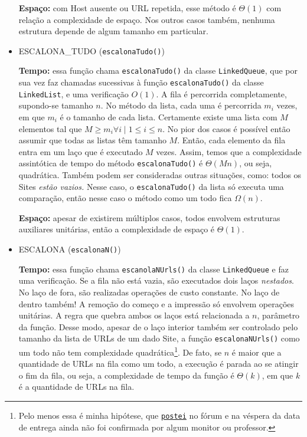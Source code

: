 \documentclass{article}
\def\code#1{\texttt{#1}}
\begin{document}
\begin{itemize}
        \textbf{Espaço:} com Host ausente ou URL repetida, esse método é \( \Theta(1) \) com relação a complexidade de espaço. Nos outros casos também, nenhuma estrutura depende de algum tamanho em particular.

    \item ESCALONA\_TUDO (\code{escalonaTudo()})

        \textbf{Tempo:} essa função chama \code{escalonaTudo()} da classe \code{LinkedQueue}, que por sua vez faz chamadas sucessivas à função \code{escalonaTudo()} da classe \code{LinkedList}, e uma verificação \( O(1) \). A fila é percorrida completamente, supondo-se tamanho \( n \). No método da lista, cada uma é percorrida \( m_i \) vezes, em que \( m_i \) é o tamanho de cada lista. Certamente existe uma lista com \( M \) elementos tal que \( M \geq m_i \forall i \mid 1 \leq i \leq n \). No pior dos casos é possível então assumir que todas as listas têm tamanho \( M \). Então, cada elemento da fila entra em um laço que é executado \( M \) vezes. Assim, temos que a complexidade assintótica de tempo do método \code{escalonaTudo()} é \( \Theta(Mn) \), ou seja, quadrática. Também podem ser consideradas outras situações, como: todos os Sites \textit{estão vazios.} Nesse caso, o \code{escalonaTudo()} da lista só executa uma comparação, então nesse caso o método como um todo fica \( \Omega(n) \).

        \textbf{Espaço:} apesar de existirem múltiplos casos, todos envolvem estruturas auxiliares unitárias, então a complexidade de espaço é \( \Theta(1) \).

    \item ESCALONA (\code{escalonaN()})

        \textbf{Tempo:} essa função chama \code{escanolaNUrls()} da classe \code{LinkedQueue} e faz uma verificação. Se a fila não está vazia, são executados dois laços \textit{nestados}. No laço de fora, são realizadas operações de custo constante. No laço de dentro também! A remoção do começo e a impressão só envolvem operações unitárias. A regra que quebra ambos os laços está relacionada a \( n \), parâmetro da função. Desse modo, apesar de o laço interior também ser controlado pelo tamanho da lista de URLs de um dado Site, a função \code{escalonaNUrls()} como um todo não tem complexidade quadrática\footnote{Pelo menos essa é minha hipótese, que \href{https://virtual.ufmg.br/20212/mod/forum/discuss.php?d=32885}{\nolinkurl{postei}} no fórum e na véspera da data de entrega ainda não foi confirmada por algum monitor ou professor.}. De fato, se \( n \) é maior que a quantidade de URLs na fila como um todo, a execução é parada ao se atingir o fim da fila, ou seja, a complexidade de tempo da função é \( \Theta(k) \), em que \( k \) é a quantidade de URLs na fila.


\end{itemize}
\end{document}
